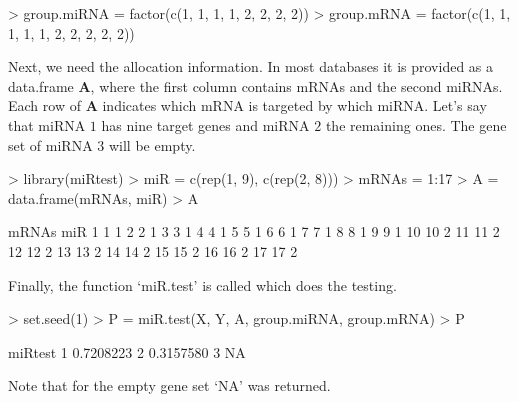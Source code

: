 \documentclass[12pt]{article}
\begin{document}
\begin{Schunk}
\begin{Sinput}
> group.miRNA = factor(c(1, 1, 1, 1, 2, 2, 2, 2))
> group.mRNA = factor(c(1, 1, 1, 1, 1, 2, 2, 2, 2, 2))
\end{Sinput}
\end{Schunk}

Next, we need the allocation information. In most databases it is provided as a data.frame $\boldsymbol{A}$, where the first column contains mRNAs and the second miRNAs. Each row of $\boldsymbol{A}$ indicates which mRNA is targeted by which miRNA. Let's say that miRNA $1$ has nine target genes and miRNA $2$ the remaining ones. The gene set of miRNA $3$ will be empty.
\begin{Schunk}
\begin{Sinput}
> library(miRtest)
> miR = c(rep(1, 9), c(rep(2, 8)))
> mRNAs = 1:17
> A = data.frame(mRNAs, miR)
> A
\end{Sinput}
\begin{Soutput}
   mRNAs miR
1      1   1
2      2   1
3      3   1
4      4   1
5      5   1
6      6   1
7      7   1
8      8   1
9      9   1
10    10   2
11    11   2
12    12   2
13    13   2
14    14   2
15    15   2
16    16   2
17    17   2
\end{Soutput}
\end{Schunk}

Finally, the function `miR.test' is called which does the testing.
\begin{Schunk}
\begin{Sinput}
> set.seed(1)
> P = miR.test(X, Y, A, group.miRNA, group.mRNA)
> P
\end{Sinput}
\begin{Soutput}
    miRtest
1 0.7208223
2 0.3157580
3        NA
\end{Soutput}
\end{Schunk}
Note that for the empty gene set `NA' was returned.
\pagebreak
\end{document}
